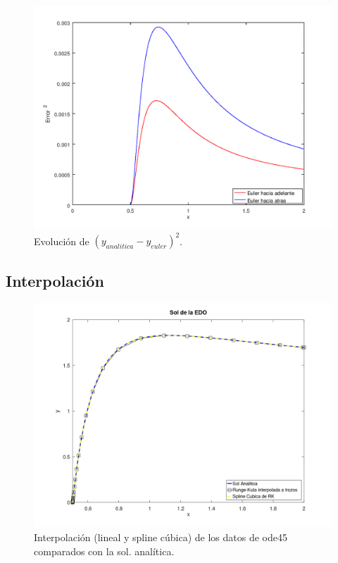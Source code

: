 \documentclass{endm}
\begin{document}
\begin{figure}
    \includegraphics[width=\linewidth]{error_euler.png}
    \caption{Evolución de $(y_{analitica} - y_{euler})^2$.}
    \label{fig:error_euler}
\end{figure}


\subsection{Interpolación}

\begin{figure}
    \includegraphics[width=\linewidth]{interpol.png}
    \caption{Interpolación (lineal y spline cúbica) de los datos de ode45 comparados con la sol. analítica.}
    \label{fig:interpol}
\end{figure}
\end{document}

